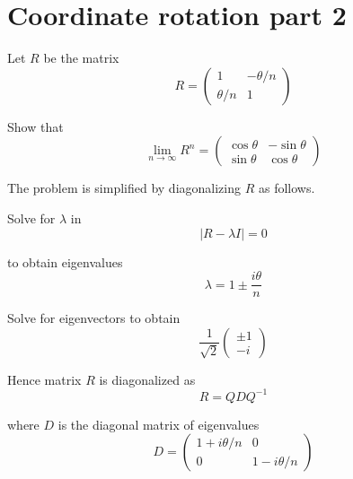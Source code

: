 


\section*{Coordinate rotation part 2}

Let $R$ be the matrix
\begin{equation*}
R=\begin{pmatrix}
1 & -\theta/n
\\
\theta/n & 1
\end{pmatrix}
\end{equation*}

Show that
\begin{equation*}
\lim_{n\rightarrow\infty}R^n=\begin{pmatrix}
\cos\theta & -\sin\theta
\\
\sin\theta & \cos\theta
\end{pmatrix}
\end{equation*}

The problem is simplified by diagonalizing $R$ as follows.

\bigskip
Solve for $\lambda$ in
\begin{equation*}
|R-\lambda I|=0
\end{equation*}

to obtain eigenvalues
\begin{equation*}
\lambda=1\pm\frac{i\theta}{n}
\end{equation*}

Solve for eigenvectors to obtain
\begin{equation*}
\frac{1}{\sqrt2}\begin{pmatrix}
\pm1
\\
-i
\end{pmatrix}
\end{equation*}

Hence matrix $R$ is diagonalized as
\begin{equation*}
R=QDQ^{-1}
\end{equation*}

where $D$ is the diagonal matrix of eigenvalues
\begin{equation*}
D=\begin{pmatrix}
1+i\theta/n & 0
\\
0 & 1-i\theta/n
\end{pmatrix}
\end{equation*}

